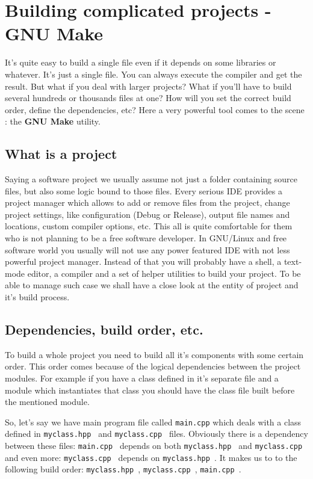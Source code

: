 
\section{Building complicated projects - GNU Make}
\label{make}
It's quite easy to build a single file even if it depends on some libraries or whatever. It's just a single file. You can always execute the compiler and get the result. But what if you deal with larger projects? What if you'll have to build several hundreds or thousands files at one? How will you set the correct build order, define the dependencies, etc? Here a very powerful tool comes to the scene : the \textbf {GNU Make} utility.

\subsection{What is a project}
Saying a software project we usually assume not just a folder containing source files, but also some logic bound to those files. Every serious IDE provides a project manager which allows to add or remove files from the project, change project settings, like configuration (Debug or Release), output file names and locations, custom compiler options, etc. This all is quite comfortable for them who is not planning to be a free software developer. In GNU/Linux and free software world you usually will not use any power featured IDE with not less powerful project manager. Instead of that you will probably have a shell, a text-mode editor, a compiler and a set of helper utilities to build your project. To be able to manage such case we shall have a close look at the entity of project and it's build process.

\subsection{Dependencies, build order, etc.}
\label{deps_order_etc}
To build a whole project you need to build all it's components with some certain order. This order comes because of the logical dependencies between the project modules. For example if you have a class defined in it's separate file and a module which instantiates that class you should have the class file built before the mentioned module.

So, let's say we have main program file called {\tt main.cpp} which deals with a class defined in {\tt myclass.hpp } and {\tt myclass.cpp } files. Obviously there is a dependency between these files: {\tt main.cpp } depends on both {\tt myclass.hpp } and {\tt myclass.cpp } and even more: {\tt myclass.cpp } depends on {\tt myclass.hpp }. It makes us to to the following build order: {\tt myclass.hpp }, {\tt myclass.cpp }, {\tt main.cpp }.

